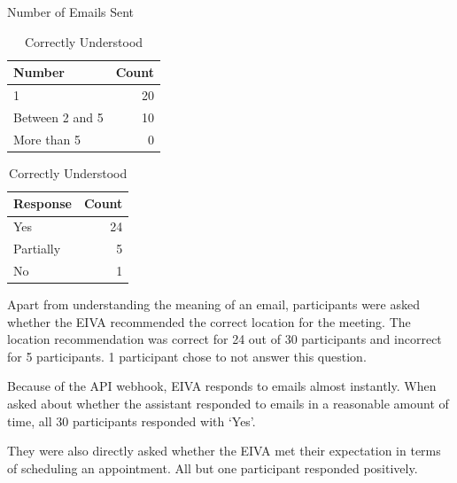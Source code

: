 \documentclass{article}
\begin{document}
\begin{table}[!htb]
	\begin{minipage}{.5\linewidth}
		\caption{Number of Emails Sent}
		\centering
		\begin{tabular}{lr}
			\hline
			\textbf{Number} & \textbf{Count} \\
			\hline
			1               & 20             \\
			Between 2 and 5 & 10             \\
			More than 5     & 0              \\
			\hline
		\end{tabular}
	\end{minipage}%
	\hspace{.1cm}
	\begin{minipage}{.5\linewidth}
		\centering
		\caption{Correctly Understood}
		\begin{tabular}{lr}
			\hline
			\textbf{Response} & \textbf{Count} \\
			\hline
			Yes               & 24             \\
			Partially         & 5              \\
			No                & 1              \\
			\hline
		\end{tabular}
	\end{minipage} 
\end{table}

Apart from understanding the meaning of an email, participants were asked whether the EIVA recommended the correct location for the meeting. The location recommendation was correct for 24 out of 30 participants and incorrect for 5 participants. 1 participant chose to not answer this question.

Because of the API webhook, EIVA responds to emails almost instantly. When asked about whether the assistant responded to emails in a reasonable amount of time, all 30 participants responded with `Yes'.

They were also directly asked whether the EIVA met their expectation in terms of scheduling an appointment. All but one participant responded positively.
\end{document}
